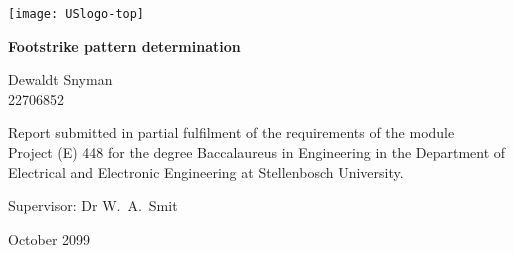 \graphicspath{{frontmatter/fig/}}

\begin{titlepage}
	\begin{center}
		
		\texttt{[image: USlogo-top]}
		
		\vfill
		
		{\sffamily \bfseries \huge Footstrike pattern determination \par}
		
		\vfill
		
		{\large {\Large Dewaldt Snyman} \\ 22706852 \par}
		
		\vfill
		
		\vfill
		
		{Report submitted in partial fulfilment of the requirements of the module \\
			Project (E) 448 for the degree Baccalaureus in Engineering in the Department of
			Electrical and Electronic Engineering at Stellenbosch University. \par}
		
		\vfill
		
		{\large {Supervisor}: Dr W.\ A.\ Smit} %
		
		\vfill
		
		{\Large October 2099}
	\end{center}
\end{titlepage}
